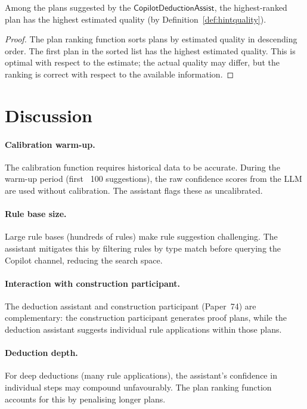 \documentclass[11pt]{article}
\newcommand{\CDA}{\mathsf{CopilotDeductionAssist}}
\begin{document}
\begin{theorem}\label{thm:planopt}
Among the plans suggested by the $\CDA$, the highest-ranked
plan has the highest estimated quality (by
Definition~\ref{def:hintquality}).
\end{theorem}
\begin{proof}
The plan ranking function sorts plans by estimated quality
in descending order.  The first plan in the sorted list has
the highest estimated quality.  This is optimal with respect
to the estimate; the actual quality may differ, but the ranking
is correct with respect to the available information.
\end{proof}

\section{Discussion}\label{sec:discussion}

\paragraph{Calibration warm-up.}
The calibration function requires historical data to be
accurate.  During the warm-up period (first ~100 suggestions),
the raw confidence scores from the LLM are used without
calibration.  The assistant flags these as uncalibrated.

\paragraph{Rule base size.}
Large rule bases (hundreds of rules) make rule suggestion
challenging.  The assistant mitigates this by filtering rules
by type match before querying the Copilot channel, reducing
the search space.

\paragraph{Interaction with construction participant.}
The deduction assistant and construction participant (Paper~74)
are complementary: the construction participant generates proof
plans, while the deduction assistant suggests individual rule
applications within those plans.

\paragraph{Deduction depth.}
For deep deductions (many rule applications), the assistant's
confidence in individual steps may compound unfavourably.
The plan ranking function accounts for this by penalising
longer plans.
\end{document}
